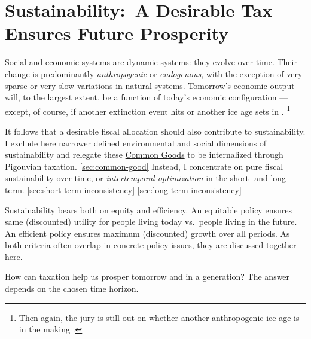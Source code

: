 \section[Sustainability]{Sustainability:~A Desirable Tax Ensures Future Prosperity}
	\label{sec:tax-sustainability}




Social and economic systems are dynamic systems:
they evolve over time.
Their change is predominantly \emph{anthropogenic} or \emph{endogenous}, with the exception of very sparse or very slow variations in natural systems.
Tomorrow's economic output will, to the largest extent, be a function of today's economic
configuration --- except, of course, if another extinction event hits or another ice age sets in \citep{Courtillot2002}.
\footnote{
	Then again, the jury is still out on whether another anthropogenic ice age is in the making \citep{UnitedNations2007, Rahmsdorf-2009}.
}


It follows that a desirable fiscal allocation should also contribute to sustainability.
I exclude here narrower defined environmental and social dimensions of sustainability and relegate these \hyperref[sec:common-good]{Common Goods} to be internalized through Pigouvian taxation. \ref{sec:common-good}
Instead, I concentrate on pure fiscal sustainability over time, or \emph{intertemporal optimization} in the \hyperref[sec:short-term-inconsistency]{short-} and \hyperref[sec:long-term-inconsistency]{long-}term. \ref{sec:short-term-inconsistency} \ref{sec:long-term-inconsistency}

Sustainability bears both on equity and efficiency.
An equitable policy ensures same (discounted) utility for people living today vs.\ people living in the future.
An efficient policy ensures maximum (discounted) growth over all periods.
As both criteria often overlap in concrete policy issues, they are discussed together here.

How can taxation help us prosper tomorrow and in a generation?
The answer depends on the chosen time horizon.

